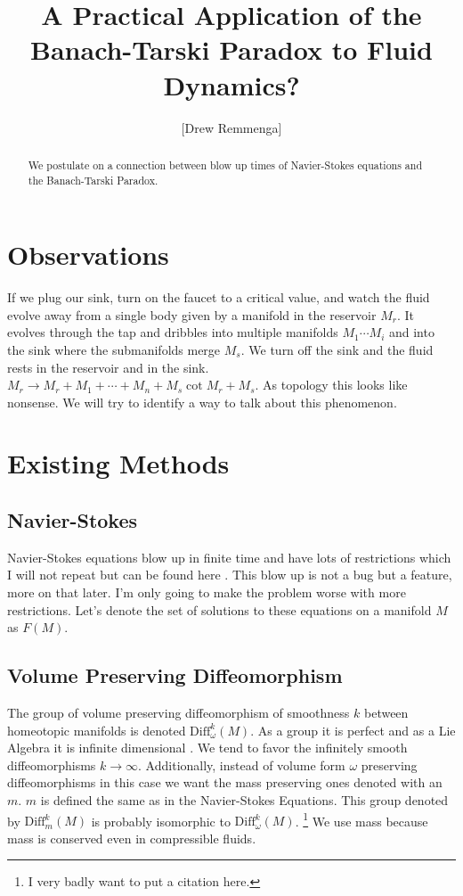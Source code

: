 \documentclass[10pt, oneside]{article}
\title{A Practical Application of the Banach-Tarski Paradox to Fluid Dynamics?}
\author{[Drew Remmenga]}
\begin{document}
\maketitle
\begin{abstract}
   We postulate on a connection between blow up times of Navier-Stokes equations and the Banach-Tarski Paradox.
\end{abstract}
\section*{Observations}
   If we plug our sink, turn on the faucet to a critical value, and watch the fluid evolve away from a single body given by a manifold in the reservoir $M_r$. It evolves through the tap and dribbles into multiple manifolds $M_1 \cdots M_i$ and into the sink where the submanifolds merge $M_s$.
   We turn off the sink and the fluid rests in the reservoir and in the sink. $M_r \to M_r + M_1 + \cdots + M_n + M_s \cot M_r + M_s$. As topology this looks like nonsense. We will try to identify a way to talk about this phenomenon.
\section*{Existing Methods}
\subsection*{Navier-Stokes}
   Navier-Stokes equations blow up in finite time \cite{tao2015finitetimeblowupaveraged} and have lots of restrictions which I will not repeat but can be found here \cite{tao2015finitetimeblowupaveraged}. This blow up is not a bug but a feature, more on that later.
   I'm only going to make the problem worse with more restrictions. Let's denote the set of solutions to these equations on a manifold $M$ as $F(M)$.
\subsection*{Volume Preserving Diffeomorphism}
   The group of volume preserving diffeomorphism of smoothness $k$ between homeotopic manifolds is denoted $\text{Diff}^k_\omega(M)$. As a group it is perfect and as a Lie Algebra it is infinite dimensional \cite{Banyaga1997}. We tend to favor the infinitely smooth diffeomorphisms $k \to \infty$.
   Additionally, instead of volume form $\omega$ preserving diffeomorphisms in this case we want the mass preserving ones denoted with an $m$. $m$ is defined the same as in the Navier-Stokes Equations. This group denoted by $\text{Diff}^k_m(M)$ is probably isomorphic to $\text{Diff}^k_\omega(M)$. \footnote{I very badly want to put a citation here.}
   We use mass because mass is conserved even in compressible fluids.
\end{document}

